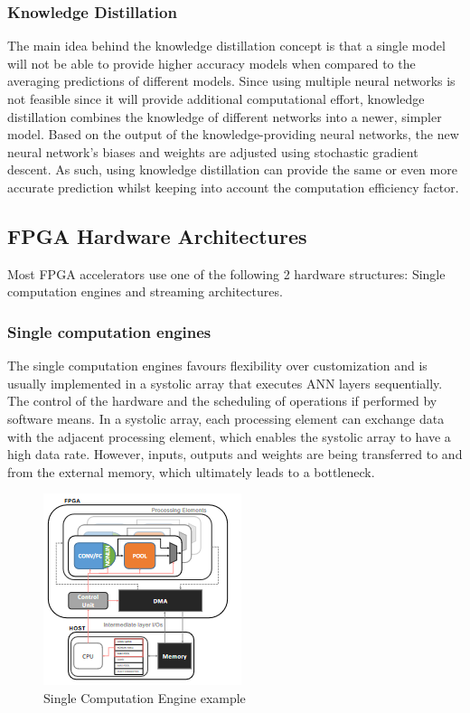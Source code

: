 \subsubsection{Knowledge Distillation}
The main idea behind the knowledge distillation concept is that a single model will not be able to provide higher accuracy models when compared to the averaging predictions of different models. Since using multiple neural networks is not feasible since it will provide additional computational effort, knowledge distillation combines the knowledge of different networks into a newer, simpler model. Based on the output of the knowledge-providing neural networks, the new neural network's biases and weights are adjusted using stochastic gradient descent\cite{efficientProcessingNNSurvey}. As such, using knowledge distillation can provide the same or even more accurate prediction whilst keeping into account the computation efficiency factor.

\subsection{FPGA Hardware Architectures}
Most FPGA accelerators use one of the following 2 hardware structures: Single computation engines and streaming architectures\cite{mappingCnnFpga}.

\subsubsection{Single computation engines}
The single computation engines favours flexibility over customization and is usually implemented in a systolic array\cite{mappingCnnFpga} that executes ANN layers sequentially. The control of the hardware and the scheduling of operations if performed by software means. In a systolic array, each processing element can exchange data with the adjacent processing element, which enables the systolic array to have a high data rate. However, inputs, outputs and weights are being transferred to and from the external memory, which ultimately leads to a bottleneck.

\begin{figure}[H]
    \centering
    \includegraphics[width=0.4\linewidth]{img/singleComputationEngine.png}
    \caption{Single Computation Engine example\cite{mappingCnnFpga}}
    \label{fig:singleComputationEngine}
\end{figure}

